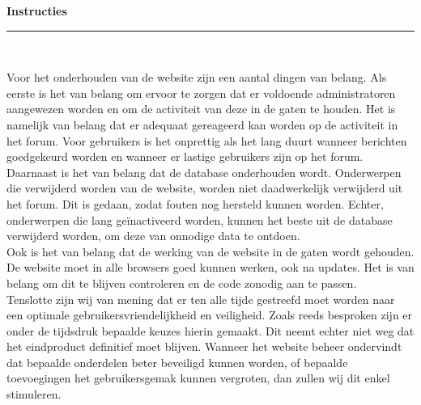 \documentclass[a4paper,12pt]{article}
\newcommand{\HRule}{\rule{\linewidth}{0.5mm}}
\begin{document}
\newpage
\begin{center}
{\LARGE \bfseries Instructies}\\[0.1cm]
\HRule \\[0.5cm]
\end{center}
Voor het onderhouden van de website zijn een aantal dingen van belang. Als eerste is het van belang om ervoor te zorgen dat er voldoende administratoren aangewezen worden en om de activiteit van deze in de gaten te houden. Het is namelijk van belang dat er adequaat gereageerd kan worden op de activiteit in het forum. Voor gebruikers is het onprettig als het lang duurt wanneer berichten goedgekeurd worden en wanneer er lastige gebruikers zijn op het forum.\\
Daarnaast is het van belang dat de database onderhouden wordt. Onderwerpen die verwijderd worden van de website, worden niet daadwerkelijk verwijderd uit het forum. Dit is gedaan, zodat fouten nog hersteld kunnen worden. Echter, onderwerpen die lang geïnactiveerd worden, kunnen het beste uit de database verwijderd worden, om deze van onnodige data te ontdoen.\\
Ook is het van belang dat de werking van de website in de gaten wordt gehouden. De website moet in alle browsers goed kunnen werken, ook na updates. Het is van belang om dit te blijven controleren en de code zonodig aan te passen. \\
Tenslotte zijn wij van mening dat er ten alle tijde gestreefd moet worden naar een optimale gebruikersvriendelijkheid en veiligheid. Zoals reeds besproken zijn er onder de tijdsdruk bepaalde keuzes hierin gemaakt. Dit neemt echter niet weg dat het eindproduct definitief moet blijven. Wanneer het website beheer ondervindt dat bepaalde onderdelen beter beveiligd kunnen worden, of bepaalde toevoegingen het gebruikersgemak kunnen vergroten, dan zullen wij dit enkel stimuleren.
\end{document}
